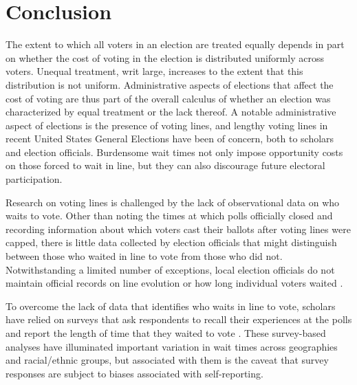 \documentclass[12pt,titlepage]{article}
\begin{document}

\section*{Conclusion}

The extent to which all voters in an election are treated equally
depends in part on whether the cost of voting in the election is
distributed uniformly across voters.  Unequal treatment, writ large,
increases to the extent that this distribution is not uniform.
Administrative aspects of elections that affect the cost of voting are
thus part of the overall calculus of whether an election was
characterized by equal treatment or the lack thereof.  A notable
administrative aspect of elections is the presence of voting lines,
and lengthy voting lines in recent United States General Elections
have been of concern, both to scholars and election officials.
Burdensome wait times not only impose opportunity costs on those
forced to wait in line, but they can also discourage future electoral
participation.

Research on voting lines is challenged by the lack of observational
data on who waits to vote.  Other than noting the times at which polls
officially closed and recording information about which voters cast
their ballots after voting lines were capped, there is little data
collected by election officials that might distinguish between those
who waited in line to vote from those who did not.  Notwithstanding a
limited number of exceptions, local election officials do not maintain
official records on line evolution or how long individual voters
waited \citep{herron:confidence}.


To overcome the lack of data that identifies who waits in line to
vote, scholars have relied on surveys that ask respondents to recall
their experiences at the polls and report the length of time that they
waited to vote \citep{stewart:waitingtovote2012,
  pettigrew:racegapwaittimes}.  These survey-based analyses have
illuminated important variation in wait times across geographies and
racial/ethnic groups, but associated with them is the caveat that
survey responses are subject to biases associated with self-reporting.
\end{document}
